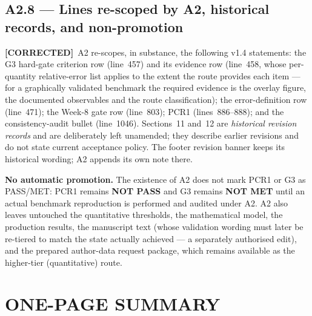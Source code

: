 \documentclass[11pt,a4paper]{article}
\newcommand{\COR}{{\color{corcol}\textbf{[CORRECTED]}}}
\begin{document}
\subsection*{A2.8 --- Lines re-scoped by A2, historical records, and non-promotion}
\COR\ A2 re-scopes, in substance, the following v1.4 statements: the G3 hard-gate criterion row
(line~457) and its evidence row (line~458, whose per-quantity relative-error list applies to the extent
the route provides each item --- for a graphically validated benchmark the required evidence is the
overlay figure, the documented observables and the route classification); the error-definition row
(line~471); the Week-8 gate row (line~803); PCR1 (lines~886--888); and the consistency-audit bullet
(line~1046). Sections~11 and~12 are \emph{historical revision records} and are deliberately left
unamended; they describe earlier revisions and do not state current acceptance policy. The footer
revision banner keeps its historical wording; A2 appends its own note there.

\textbf{No automatic promotion.} The existence of A2 does not mark PCR1 or G3 as PASS/MET: PCR1 remains
\textbf{NOT PASS} and G3 remains \textbf{NOT MET} until an actual benchmark reproduction is performed and
audited under A2. A2 also leaves untouched the quantitative thresholds, the mathematical model, the
production results, the manuscript text (whose validation wording must later be re-tiered to match the
state actually achieved --- a separately authorised edit), and the prepared author-data request package,
which remains available as the higher-tier (quantitative) route.
\section*{\color{lockblue}ONE-PAGE SUMMARY}
\end{document}
